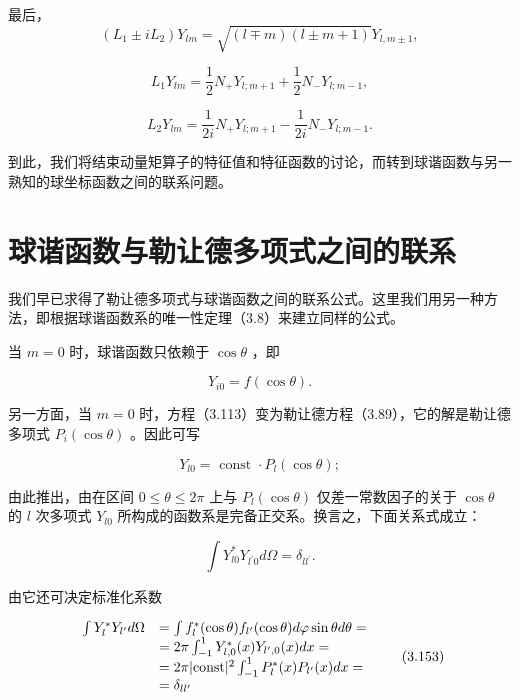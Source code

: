 最后，
\begin{equation*}
\left(L _ {1} \pm i L _ {2}\right) Y _ {l m} = \sqrt {(l \mp m) (l \pm m + 1)} Y _ {l, m \pm 1},\tag{3.148}
\end{equation*}

\begin{equation*}
L _ {1} Y _ {l m} = \frac {1}{2} N _ {+} Y _ {l; m + 1} + \frac {1}{2} N _ {-} Y _ {l; m - 1},\tag{3.149}
\end{equation*}

\begin{equation*}
L _ {2} Y _ {l m} = \frac {1}{2 i} N _ {+} Y _ {l; m + 1} - \frac {1}{2 i} N _ {-} Y _ {l; m - 1}.\tag{3.150}
\end{equation*}

到此，我们将结束动量矩算子的特征值和特征函数的讨论，而转到球谐函数与另一熟知的球坐标函数之间的联系问题。

\section{球谐函数与勒让德多项式之间的联系}

我们早已求得了勒让德多项式与球谐函数之间的联系公式。这里我们用另一种方法，即根据球谐函数系的唯一性定理（3.8）来建立同样的公式。

当 $m = 0$ 时，球谐函数只依赖于 $\cos \theta$ ，即

\begin{equation*}
Y _ {i 0} = f (\cos \theta).
\end{equation*}

另一方面，当 $m = 0$ 时，方程（3.113）变为勒让德方程（3.89），它的解是勒让德多项式 $P_{i}(\cos \theta)$ 。因此可写

\begin{equation*}
Y _ {l 0} = \text { const } \cdot P _ {l} (\cos \theta);\tag{3.151}
\end{equation*}

由此推出，由在区间 $0 \leqslant \theta \leqslant 2\pi$ 上与 $P_{l}(\cos \theta)$ 仅差一常数因子的关于 $\cos \theta$ 的 $l$ 次多项式 $Y_{l0}$ 所构成的函数系是完备正交系。换言之，下面关系式成立：

\begin{equation*}
\int Y _ {l 0} ^ {*} Y _ {l ^ {\prime} 0} d \Omega = \delta_ {l l ^ {\prime}}.\tag{3.152}
\end{equation*}

由它还可决定标准化系数

\begin{equation*}
\begin{array}{r l} \int Y _ {l} ^ {*} Y _ {l ^ {\prime}} d \Omega & = \int f _ {l} ^ {*} (\cos \theta) f _ {l ^ {\prime}} (\cos \theta) d \varphi \sin \theta d \theta = \\ & = 2 \pi \int_ {- 1} ^ {1} Y _ {l, 0} ^ {*} (x) Y _ {l ^ {\prime}, 0} (x) d x = \\ & = 2 \pi | \text {const} | ^ {2} \int_ {- 1} ^ {1} P _ {l} ^ {*} (x) P _ {l ^ {\prime}} (x) d x = \\ & = \delta_ {l l ^ {\prime}} \end{array} \tag{3.153}
\end{equation*}

